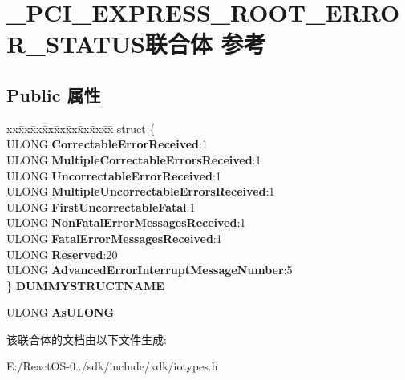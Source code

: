 \hypertarget{union___p_c_i___e_x_p_r_e_s_s___r_o_o_t___e_r_r_o_r___s_t_a_t_u_s}{}\section{\+\_\+\+P\+C\+I\+\_\+\+E\+X\+P\+R\+E\+S\+S\+\_\+\+R\+O\+O\+T\+\_\+\+E\+R\+R\+O\+R\+\_\+\+S\+T\+A\+T\+U\+S联合体 参考}
\label{union___p_c_i___e_x_p_r_e_s_s___r_o_o_t___e_r_r_o_r___s_t_a_t_u_s}
\subsection*{Public 属性}
\begin{DoxyCompactItemize}
\item 
\mbox{\label{union___p_c_i___e_x_p_r_e_s_s___r_o_o_t___e_r_r_o_r___s_t_a_t_u_s_a7dbec8fd04102f9a4f98fe839801b108}} 
\begin{tabbing}
xx\=xx\=xx\=xx\=xx\=xx\=xx\=xx\=xx\=\kill
struct \{\\
\>ULONG {\bfseries CorrectableErrorReceived}:1\\
\>ULONG {\bfseries MultipleCorrectableErrorsReceived}:1\\
\>ULONG {\bfseries UncorrectableErrorReceived}:1\\
\>ULONG {\bfseries MultipleUncorrectableErrorsReceived}:1\\
\>ULONG {\bfseries FirstUncorrectableFatal}:1\\
\>ULONG {\bfseries NonFatalErrorMessagesReceived}:1\\
\>ULONG {\bfseries FatalErrorMessagesReceived}:1\\
\>ULONG {\bfseries Reserved}:20\\
\>ULONG {\bfseries AdvancedErrorInterruptMessageNumber}:5\\
\} {\bfseries DUMMYSTRUCTNAME}\\

\end{tabbing}\item 
\mbox{\label{union___p_c_i___e_x_p_r_e_s_s___r_o_o_t___e_r_r_o_r___s_t_a_t_u_s_a56b85645f3a08d1a8da0904773d4aea6}} 
U\+L\+O\+NG {\bfseries As\+U\+L\+O\+NG}
\end{DoxyCompactItemize}


该联合体的文档由以下文件生成\+:\begin{DoxyCompactItemize}
\item 
E\+:/\+React\+O\+S-\/0../sdk/include/xdk/iotypes.\+h\end{DoxyCompactItemize}
